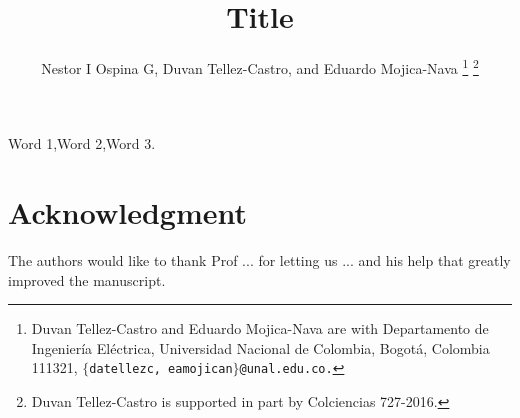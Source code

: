 \documentclass[letterpaper,10pt,conference,draftcls,onecolumn]{ieeeconf} %
\theoremstyle{plain}
\begin{document}
\title{\LARGE \bf  Title}

\author{Nestor I Ospina G, Duvan Tellez-Castro,
        and Eduardo Mojica-Nava
\thanks{Duvan Tellez-Castro and Eduardo Mojica-Nava are with Departamento de Ingenier\'ia El\'ectrica, Universidad Nacional de Colombia, Bogot\'a, Colombia 111321, $\{$\texttt{datellezc, eamojican$\}$@unal.edu.co.}}        
\thanks{Duvan Tellez-Castro is supported in part by Colciencias 727-2016.}
}        
 
\maketitle

\begin{abstract}

 
 
\end{abstract}
\begin{keywords}
	Word 1,Word 2,Word 3. %
\end{keywords}



 
 


\section*{Acknowledgment}
The authors would like to thank Prof ... for  letting us ... and his help that greatly improved the manuscript.
%

\printbibliography
\end{document}
